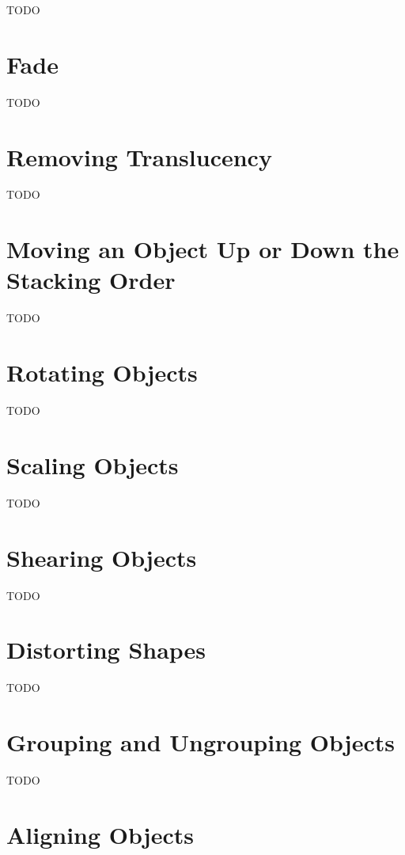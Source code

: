 TODO


\section{Fade}\label{sec:fade}

TODO


\section{Removing Translucency}\label{sec:removetrans}

TODO


\section{Moving an Object Up or Down the Stacking Order}\label{sec:moveupordown}

TODO


\section{Rotating Objects}\label{sec:rotateobjects}

TODO


\section{Scaling Objects}\label{sec:scaleobjects}

TODO


\section{Shearing Objects}\label{sec:shearobjects}

TODO


\section{Distorting Shapes}\label{sec:distort}

TODO


\section{Grouping and Ungrouping Objects}\label{sec:grouping}

TODO


\section{Aligning Objects}\label{sec:alignobjects}

